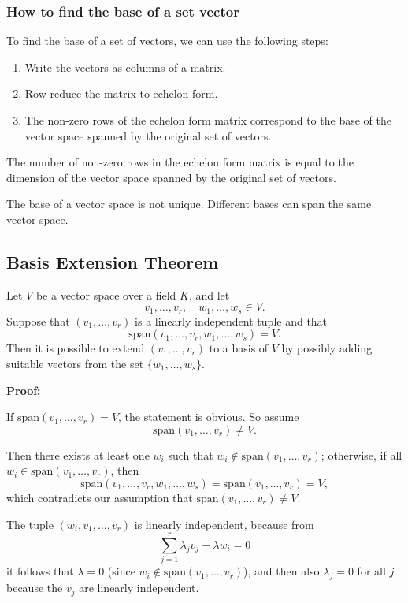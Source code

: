 \subsubsection{How to find the base of a set vector}
To find the base of a set of vectors, we can use the following steps:
\begin{enumerate}
	\item Write the vectors as columns of a matrix.
	\item Row-reduce the matrix to echelon form.
	\item The non-zero rows of the echelon form matrix correspond to the base of the vector space spanned by the original set of vectors.
\end{enumerate}
The number of non-zero rows in the echelon form matrix is equal to the dimension of the vector space spanned by the original set of vectors.
\vspace{\baselineskip}

The base of a vector space is not unique. Different bases can span the same vector space.

\subsection{Basis Extension Theorem}

Let \(V\) be a vector space over a field \(K\), and let 
\[
v_1, \ldots, v_r,\quad w_1, \ldots, w_s \in V.
\]
Suppose that \((v_1, \ldots, v_r)\) is a linearly independent tuple and that
\[
\text{span}(v_1, \ldots, v_r, w_1, \ldots, w_s) = V.
\]
Then it is possible to extend \((v_1, \ldots, v_r)\) to a basis of \(V\) by possibly adding suitable vectors from the set \(\{w_1, \ldots, w_s\}\).
\vspace{\baselineskip}

\textbf{Proof:}

If \(\text{span}(v_1, \ldots, v_r) = V\), the statement is obvious. So assume
\[
\text{span}(v_1, \ldots, v_r) \neq V.
\]

Then there exists at least one \(w_i\) such that \(w_i \notin \text{span}(v_1, \ldots, v_r)\); otherwise, if all \(w_i \in \text{span}(v_1, \ldots, v_r)\), then
\[
\text{span}(v_1, \ldots, v_r, w_1, \ldots, w_s) = \text{span}(v_1, \ldots, v_r) = V,
\]
which contradicts our assumption that \(\text{span}(v_1, \ldots, v_r) \neq V\).

The tuple \((w_i, v_1, \ldots, v_r)\) is linearly independent, because from
\[
\sum_{j=1}^r \lambda_j v_j + \lambda w_i = 0
\]
it follows that \(\lambda = 0\) (since \(w_i \notin \text{span}(v_1, \ldots, v_r)\)), and then also \(\lambda_j = 0\) for all \(j\) because the \(v_j\) are linearly independent.

